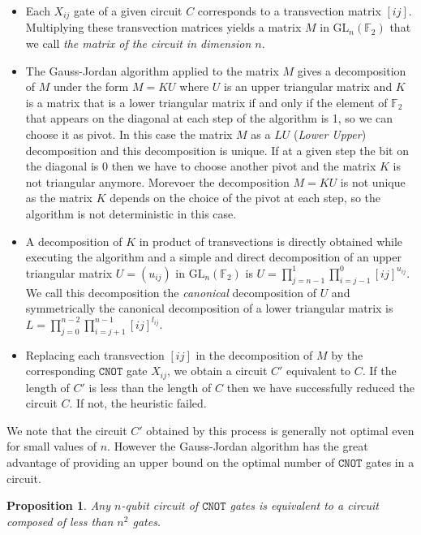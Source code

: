 \documentclass[a4paper,12pt,fleqn]{article}
\newcommand\cnot{\mathtt{CNOT}}
\newcommand\F{\mathbb{F}}
\newcommand\GL[1][n]{\mathrm{GL}_{#1}(\mathbb{F}_2)}
\newtheorem{prop}[theo]{Proposition}
\begin{document}
\begin{itemize}
  
\item Each $X_{ij}$ gate of a given circuit $C$ corresponds to a transvection matrix $[ij]$.
  Multiplying these transvection matrices yields a matrix $M$ in $\GL$ that we call \emph{the matrix of the circuit in dimension $n$}.

  
\item The Gauss-Jordan algorithm applied to the matrix $M$ gives a decomposition of $M$ under the form $M=KU$ where  $U$ is an upper triangular matrix
  and $K$ is a matrix that is a lower triangular matrix if and only if the element of $\F_2$ that appears on the diagonal at each step of the algorithm is 1, so we can choose it as pivot.
  In this case the matrix $M$ as a $LU$ (\emph{Lower Upper}) decomposition and this decomposition is unique. If at a given step the bit on the diagonal is 0 then we have to choose another pivot and the matrix $K$ is not triangular anymore.
    Morevoer the decomposition $M=KU$ is not unique as the matrix $K$ depends on the choice of the pivot at each step, so the algorithm is not deterministic in this case.
    

\item A decomposition of $K$ in product of transvections is directly obtained while executing the algorithm and a simple and direct decomposition of an upper triangular matrix $U=(u_{ij})$ in $\GL$ is
  $U=\prod_{j=n-1}^{1}\prod_{i=j-1}^{0}[ij]^{u_{ij}}$. We call this decomposition the \emph{canonical} decomposition of $U$ and symmetrically the canonical
  decomposition of a lower triangular matrix is  $L=\prod_{j=0}^{n-2}\prod_{i=j+1}^{n-1}[ij]^{l_{ij}}$.
  
\item Replacing each transvection $[ij]$ in the decomposition of $M$  by the corresponding $\cnot$ gate $X_{ij}$,
  we obtain a circuit $C'$ equivalent to $C$.  If the length of $C'$ is less than the length of $C$ then we have successfully reduced the circuit $C$. If not, the heuristic failed.
  
\end{itemize}

We note that the circuit $C'$ obtained by this process is generally  not optimal even for small values of $n$.
However the Gauss-Jordan algorithm has the great
advantage of providing  an upper bound on the optimal number of $\cnot$ gates in a circuit.


\begin{prop}\label{boundGauss}
Any $n$-qubit circuit of $\cnot$ gates is equivalent to a circuit composed of less than $n^2$ gates.
\end{prop}
\end{document}
